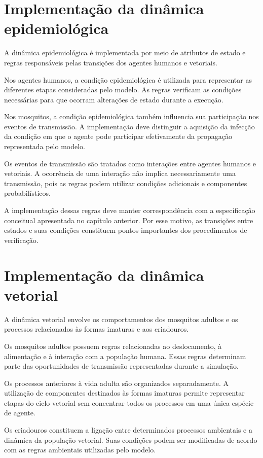 \section{Implementação da dinâmica epidemiológica}

A dinâmica epidemiológica é implementada por meio de atributos de estado e regras responsáveis pelas transições dos agentes humanos e vetoriais.

Nos agentes humanos, a condição epidemiológica é utilizada para representar as diferentes etapas consideradas pelo modelo. As regras verificam as condições necessárias para que ocorram alterações de estado durante a execução.

Nos mosquitos, a condição epidemiológica também influencia sua participação nos eventos de transmissão. A implementação deve distinguir a aquisição da infecção da condição em que o agente pode participar efetivamente da propagação representada pelo modelo.

Os eventos de transmissão são tratados como interações entre agentes humanos e vetoriais. A ocorrência de uma interação não implica necessariamente uma transmissão, pois as regras podem utilizar condições adicionais e componentes probabilísticos.

A implementação dessas regras deve manter correspondência com a especificação conceitual apresentada no capítulo anterior. Por esse motivo, as transições entre estados e suas condições constituem pontos importantes dos procedimentos de verificação.

\section{Implementação da dinâmica vetorial}

A dinâmica vetorial envolve os comportamentos dos mosquitos adultos e os processos relacionados às formas imaturas e aos criadouros.

Os mosquitos adultos possuem regras relacionadas ao deslocamento, à alimentação e à interação com a população humana. Essas regras determinam parte das oportunidades de transmissão representadas durante a simulação.

Os processos anteriores à vida adulta são organizados separadamente. A utilização de componentes destinados às formas imaturas permite representar etapas do ciclo vetorial sem concentrar todos os processos em uma única espécie de agente.

Os criadouros constituem a ligação entre determinados processos ambientais e a dinâmica da população vetorial. Suas condições podem ser modificadas de acordo com as regras ambientais utilizadas pelo modelo.

